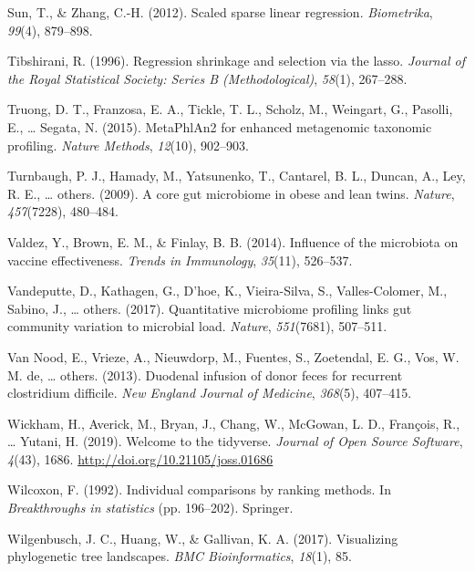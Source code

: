 \documentclass[12pt,a4paper]{reedthesis}
\theoremstyle{definition}
\theoremstyle{definition}
\theoremstyle{definition}
\theoremstyle{remark}
\begin{document}
\leavevmode\hypertarget{ref-sun2012scaled}{}%
Sun, T., \& Zhang, C.-H. (2012). Scaled sparse linear regression. \emph{Biometrika}, \emph{99}(4), 879--898.

\leavevmode\hypertarget{ref-tibshirani1996regression}{}%
Tibshirani, R. (1996). Regression shrinkage and selection via the lasso. \emph{Journal of the Royal Statistical Society: Series B (Methodological)}, \emph{58}(1), 267--288.

\leavevmode\hypertarget{ref-truong2015metaphlan2}{}%
Truong, D. T., Franzosa, E. A., Tickle, T. L., Scholz, M., Weingart, G., Pasolli, E., \ldots{} Segata, N. (2015). MetaPhlAn2 for enhanced metagenomic taxonomic profiling. \emph{Nature Methods}, \emph{12}(10), 902--903.

\leavevmode\hypertarget{ref-turnbaugh2009core}{}%
Turnbaugh, P. J., Hamady, M., Yatsunenko, T., Cantarel, B. L., Duncan, A., Ley, R. E., \ldots{} others. (2009). A core gut microbiome in obese and lean twins. \emph{Nature}, \emph{457}(7228), 480--484.

\leavevmode\hypertarget{ref-valdez2014influence}{}%
Valdez, Y., Brown, E. M., \& Finlay, B. B. (2014). Influence of the microbiota on vaccine effectiveness. \emph{Trends in Immunology}, \emph{35}(11), 526--537.

\leavevmode\hypertarget{ref-vandeputte2017quantitative}{}%
Vandeputte, D., Kathagen, G., D'hoe, K., Vieira-Silva, S., Valles-Colomer, M., Sabino, J., \ldots{} others. (2017). Quantitative microbiome profiling links gut community variation to microbial load. \emph{Nature}, \emph{551}(7681), 507--511.

\leavevmode\hypertarget{ref-nood2013duodenal}{}%
Van Nood, E., Vrieze, A., Nieuwdorp, M., Fuentes, S., Zoetendal, E. G., Vos, W. M. de, \ldots{} others. (2013). Duodenal infusion of donor feces for recurrent clostridium difficile. \emph{New England Journal of Medicine}, \emph{368}(5), 407--415.

\leavevmode\hypertarget{ref-tidyverse2019}{}%
Wickham, H., Averick, M., Bryan, J., Chang, W., McGowan, L. D., François, R., \ldots{} Yutani, H. (2019). Welcome to the tidyverse. \emph{Journal of Open Source Software}, \emph{4}(43), 1686. \url{http://doi.org/10.21105/joss.01686}

\leavevmode\hypertarget{ref-wilcoxon1992individual}{}%
Wilcoxon, F. (1992). Individual comparisons by ranking methods. In \emph{Breakthroughs in statistics} (pp. 196--202). Springer.

\leavevmode\hypertarget{ref-wilgenbusch2017visualizing}{}%
Wilgenbusch, J. C., Huang, W., \& Gallivan, K. A. (2017). Visualizing phylogenetic tree landscapes. \emph{BMC Bioinformatics}, \emph{18}(1), 85.
\end{document}
